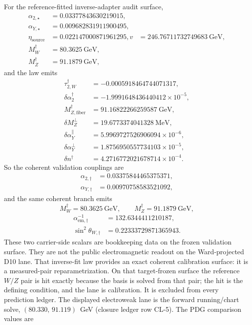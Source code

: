 \documentclass[11pt]{article}
\begin{document}
For the reference-fitted inverse-adapter audit surface,
\[
\begin{aligned}
\alpha_{2,\star}&=0.03377843630219015,\\
\alpha_{Y,\star}&=0.009682831911900495,\\
\eta_{\mathrm{source}}&=0.022147000871961295,
v&=246.76711732749683~\mathrm{GeV},\\
M_W^\dagger&=80.3625~\mathrm{GeV},\\
M_Z^\dagger&=91.1879~\mathrm{GeV},
\end{aligned}
\]
and the law emits
\[
\begin{aligned}
\tau_{2,W}^\dagger&=-0.0005918464744071317,\\
\delta\alpha_2^\dagger&=-1.9991648436440412\times10^{-5},\\
M_{Z,\mathrm{fiber}}^\dagger&=91.16822266259587~\mathrm{GeV},\\
\delta M_Z^\perp&=19.6773374041328~\mathrm{MeV},\\
\delta\alpha_Y^\parallel&=5.9969727526906094\times10^{-6},\\
\delta\alpha_Y^\perp&=1.8756950557734103\times10^{-5},\\
\delta n^\dagger&=4.2716772021678714\times10^{-4}.
\end{aligned}
\]
So the coherent validation couplings are
\[
\begin{aligned}
\alpha_{2,\dagger}&=0.03375844465375371,\\
\alpha_{Y,\dagger}&=0.00970758583521092,
\end{aligned}
\]
and the same coherent branch emits
\[
M_W^\dagger=80.3625~\mathrm{GeV},
\qquad
M_Z^\dagger=91.1879~\mathrm{GeV},
\]
\[
\begin{aligned}
\alpha_{\mathrm{em},\dagger}^{-1}&=132.6344411210187,\\
\sin^2\theta_{W,\dagger}&=0.22333729871365943.
\end{aligned}
\]
These two carrier-side scalars are bookkeeping data on the frozen validation surface. They are not
the public electromagnetic readout on the Ward-projected D10 lane.
That inverse-fit law provides an exact coherent calibration surface: it is a
measured-pair reparametrization. On that
target-frozen surface the reference \(W/Z\) pair is hit exactly because the basis is solved from
that pair; the hit is the defining condition, and the lane is calibration.
It is excluded from every prediction ledger.
The displayed electroweak lane is the forward running/chart solve,
\((80.330,\,91.119)\)~GeV (closure ledger row CL-5). The PDG comparison values are
\end{document}
